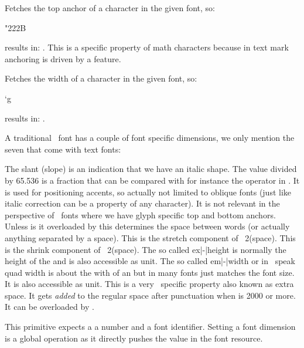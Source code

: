 Fetches the top anchor of a character in the given font, so:

\startbuffer
\the\fontcharba{} "222B
\stopbuffer

results in: \inlinebuffer. This is a specific property of math characters because
in text mark anchoring is driven by a feature.

\stopnewprimitive

\startoldprimitive[title={\prm {fontcharwd}}]

Fetches the width of a character in the given font, so:

\startbuffer
\the\fontcharwd\font`g
\stopbuffer

results in: \inlinebuffer.

\stopoldprimitive

\startoldprimitive[title={\prm {fontdimen}}][obsolete=yes]

A traditional \TEX\ font has a couple of font specific dimensions, we only
mention the seven that come with text fonts:

\startitemize[n,packed]
\startitem
    The slant (slope) is an indication that we have an italic shape. The value
    divided by 65.536 is a fraction that can be compared with for instance the
     operator in \METAPOST. It is used for positioning accents, so
    actually not limited to oblique fonts (just like italic correction can be a
    property of any character). It is not relevant in the perspective of
    \OPENTYPE\ fonts where we have glyph specific top and bottom anchors.
\stopitem
\startitem
    Unless is it overloaded by  this determines the space between
    words (or actually anything separated by a space).
\stopitem
\startitem
    This is the stretch component of ~2(space).
\startitem
    This is the shrink component of ~2(space).
\stopitem
\startitem
    The so called ex|-|height is normally the height of the  and is
    also accessible as  unit.
\stopitem
\startitem
    The so called em|-|width or in \TEX\ speak quad width is about the with of an
     but in many fonts just matches the font size. It is also
    accessible as  unit.
\stopitem
\startitem
    This is a very \TEX\ specific property also known as extra space. It gets
    {\em added} to the regular space after punctuation when  is
    2000 or more. It can be overloaded by .
\stopitem
\stopitemize

This primitive expects a a number and a font identifier. Setting a font dimension
is a global operation as it directly pushes the value in the font resource.

